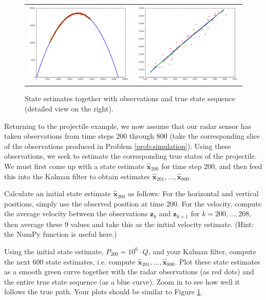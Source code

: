 \begin{figure}
    \centering
    \begin{tabular}{cc}
    \includegraphics[width=.45\textwidth]{estimate_macro} &
    \includegraphics[width=.45\textwidth]{estimate_micro}
    \end{tabular}
    \caption{State estimates together with observations and true state sequence (detailed view on the right).}
    \label{fig:estimates}
\end{figure}

Returning to the projectile example, we now assume that our radar sensor has taken observations from time steps $200$ through $800$ (take the corresponding slice of the
observations produced in Problem \ref{prob:simulation}).
Using these observations, we seek to estimate the corresponding true states of the projectile.
We must first come up with a state estimate $\widehat{\mathbf{x}}_{200}$ for time step $200$, and then feed this into the Kalman filter
to obtain estimates $\widehat{\mathbf{x}}_{201}, \ldots, \widehat{\mathbf{x}}_{800}$.
\begin{problem}
Calculate an initial state estimate $\widehat{\mathbf{x}}_{200}$ as follows:
For the horizontal and vertical positions, simply use the observed position at time $200$.
For the velocity, compute the average velocity between the observations $\mathbf{z}_k$ and $\mathbf{z}_{k+1}$ for
$k = 200,\ldots,208$, then average these 9 values and take this as the initial velocity estimate.
(Hint: the NumPy function  is useful here.)

Using the initial state estimate, $P_{200} = 10^{6} \cdot Q$, and your Kalman filter, compute the next $600$ state estimates,
i.e. compute $\widehat{\mathbf{x}}_{201}, \ldots, \widehat{\mathbf{x}}_{800}$.
Plot these state estimates as a smooth green curve together with the radar observations (as red dots) and the entire true state sequence (as a blue curve).
Zoom in to see how well it follows the true path. Your plots should be similar to Figure \ref{fig:estimates}.
\label{prob:state_estimate}
\end{problem}


